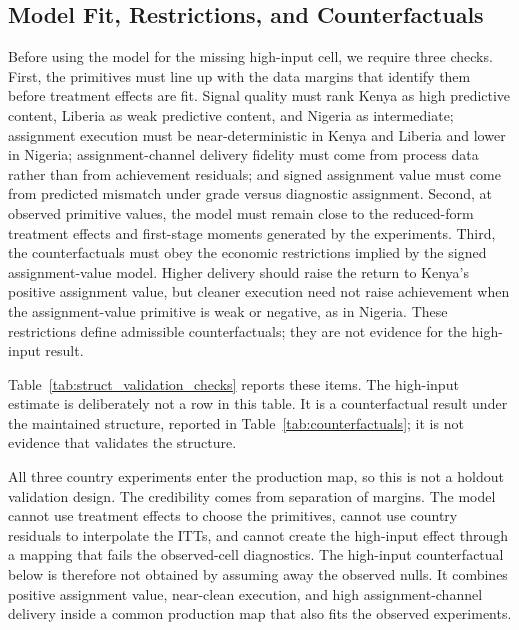 \documentclass[11pt]{article}
\begin{document}
\subsection{Model Fit, Restrictions, and Counterfactuals}
\label{subsec:struct_acceptance}

Before using the model for the missing high-input cell, we require three checks. First, the primitives must line up with the data margins that identify them before treatment effects are fit. Signal quality must rank Kenya as high predictive content, Liberia as weak predictive content, and Nigeria as intermediate; assignment execution must be near-deterministic in Kenya and Liberia and lower in Nigeria; assignment-channel delivery fidelity must come from process data rather than from achievement residuals; and signed assignment value must come from predicted mismatch under grade versus diagnostic assignment. Second, at observed primitive values, the model must remain close to the reduced-form treatment effects and first-stage moments generated by the experiments. Third, the counterfactuals must obey the economic restrictions implied by the signed assignment-value model. Higher delivery should raise the return to Kenya's positive assignment value, but cleaner execution need not raise achievement when the assignment-value primitive is weak or negative, as in Nigeria. These restrictions define admissible counterfactuals; they are not evidence for the high-input result.

Table~\ref{tab:struct_validation_checks} reports these items. The high-input estimate is deliberately not a row in this table. It is a counterfactual result under the maintained structure, reported in Table~\ref{tab:counterfactuals}; it is not evidence that validates the structure.



All three country experiments enter the production map, so this is not a holdout validation design. The credibility comes from separation of margins. The model cannot use treatment effects to choose the primitives, cannot use country residuals to interpolate the ITTs, and cannot create the high-input effect through a mapping that fails the observed-cell diagnostics. The high-input counterfactual below is therefore not obtained by assuming away the observed nulls. It combines positive assignment value, near-clean execution, and high assignment-channel delivery inside a common production map that also fits the observed experiments.
\end{document}
